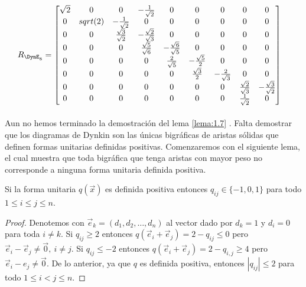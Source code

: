 \begin{align*}
 R_{\DynE_{8}} &  = \begin{bmatrix}
 \sqrt{2} & 0 & 0 & -\frac{1}{\sqrt{2}} & 0 & 0 & 0 & 0 & 0\\
 0 & sqrt(2) & - \frac{1}{\sqrt{2}}& 0 & 0 & 0 & 0 & 0 & 0\\
 0 & 0 & \frac{\sqrt{3}}{\sqrt{2}} & -\frac{\sqrt{2}}{\sqrt{3}} & 0 & 0 & 0 & 0 & 0\\
 0 & 0 & 0 & \frac{\sqrt{5}}{\sqrt{6}} & -\frac{\sqrt{6}}{\sqrt{5}} & 0 & 0 & 0 & 0\\
 0 & 0 & 0 & 0 & \frac{2}{\sqrt{5}} & -\frac{\sqrt{5}}{2} & 0 & 0 & 0\\
 0 & 0 & 0 & 0 & 0 & \frac{\sqrt{3}}{2} & -\frac{2}{\sqrt{3}} & 0 & 0\\
 0 & 0 & 0 & 0 & 0 & 0 & 0 & \frac{\sqrt{2}}{\sqrt{3}} & - \frac{\sqrt{3}}{\sqrt{2}}\\
 0 & 0 & 0 & 0 & 0 & 0 & 0 & \frac{1}{\sqrt{2}} & 0\\
 \end{bmatrix}
\end{align*}

\paragraph{}
Aun no hemos terminado la demostración del lema \ref{lema:1.7} . Falta demostrar que los diagramas de Dynkin son las únicas bigráficas de aristas sólidas que definen formas unitarias definidas positivas. Comenzaremos con el siguiente lema, el cual muestra que toda bigráfica que tenga aristas con mayor peso no corresponde a ninguna forma unitaria definida positiva.

\begin{lemma}
Si la forma unitaria $q(\overrightarrow{x})$ es definida positiva entonces $q_{ij} \in \{-1,0,1\}$ para todo $1\leq i \le j \leq n$.
\label{lema:1.8}
\end{lemma}

\begin{proof}
Denotemos con $ \overrightarrow{e}_{k} = \left(d_{1},d_{2}, \ldots , d_{n}\right)$ al vector dado por $d_{k} = 1$ y $d_{i} = 0$ para toda $i\neq k$. Si $q_{ij} \geq 2$ entonces $q(\overrightarrow{e}_{i} + \overrightarrow{e}_{j}) = 2 - q_{ij} \leq 0$ pero $\overrightarrow{e}_{i} - \overrightarrow{e}_{j} \neq \overrightarrow{0}, ~ i \neq j$. Si $q_{ij} \leq -2$ entonces $q\left(\overrightarrow{e}_{i}+ \overrightarrow{e}_{j}\right) = 2 - q_{i,j} \geq 4$ pero $\overrightarrow{e}_{i} - e_{j} \neq \overrightarrow{0}$. De lo anterior, ya que $q$ es definida positiva, entonces $|q_{ij}| \le 2$ para todo $1 \leq i < j \leq n$.
\end{proof}

